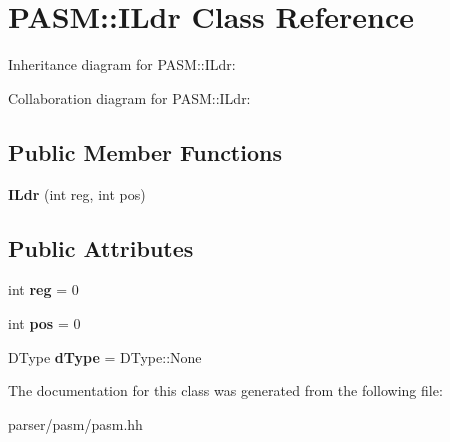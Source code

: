 \hypertarget{classPASM_1_1ILdr}{}\section{P\+A\+SM\+:\+:I\+Ldr Class Reference}
\label{classPASM_1_1ILdr}


Inheritance diagram for P\+A\+SM\+:\+:I\+Ldr\+:


Collaboration diagram for P\+A\+SM\+:\+:I\+Ldr\+:
\subsection*{Public Member Functions}
\begin{DoxyCompactItemize}
\item 
\mbox{\label{classPASM_1_1ILdr_a67c19ecfff67b5ed14857d2fa6746ba3}} 
{\bfseries I\+Ldr} (int reg, int pos)
\end{DoxyCompactItemize}
\subsection*{Public Attributes}
\begin{DoxyCompactItemize}
\item 
\mbox{\label{classPASM_1_1ILdr_a3d1227eff2d47801c375ecae02b15da5}} 
int {\bfseries reg} = 0
\item 
\mbox{\label{classPASM_1_1ILdr_a5e8c3d0dcfd8c33412723180bcd02ac9}} 
int {\bfseries pos} = 0
\item 
\mbox{\label{classPASM_1_1ILdr_acd0f13dfd7d09013fb1d22d2cff12c04}} 
D\+Type {\bfseries d\+Type} = D\+Type\+::\+None
\end{DoxyCompactItemize}


The documentation for this class was generated from the following file\+:\begin{DoxyCompactItemize}
\item 
parser/pasm/pasm.\+hh\end{DoxyCompactItemize}
